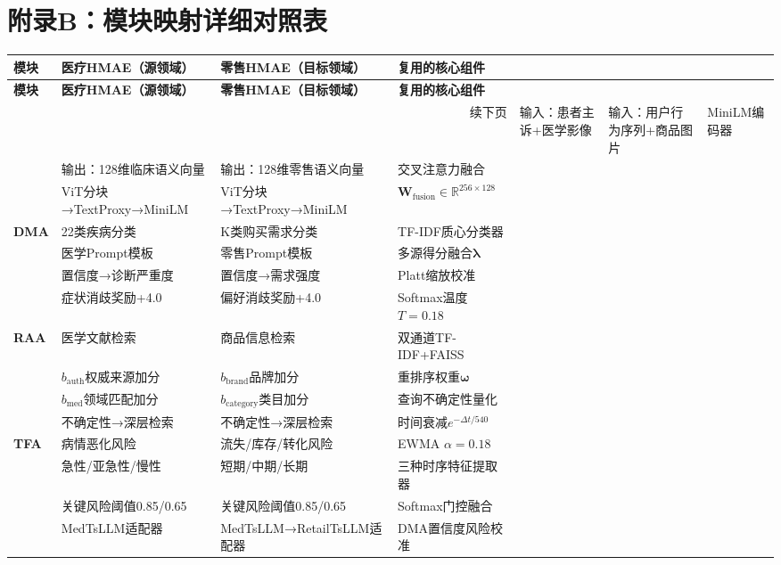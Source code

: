 \documentclass[11pt,a4paper]{ctexart}
\theoremstyle{remark}
\begin{document}
\newpage

\section*{附录B：模块映射详细对照表}

\begin{longtable}{p{2.2cm}|p{4.5cm}|p{4.5cm}|p{3cm}}
\toprule
\textbf{模块} & \textbf{医疗HMAE（源领域）} & \textbf{零售HMAE（目标领域）} & \textbf{复用的核心组件} \\
\midrule
\endfirsthead
\midrule
\textbf{模块} & \textbf{医疗HMAE（源领域）} & \textbf{零售HMAE（目标领域）} & \textbf{复用的核心组件} \\
\midrule
\endhead
\midrule
\multicolumn{4}{r}{\small 续下页}
\endfoot
\bottomrule
\endlastfoot

\textbf{Perception} &
输入：患者主诉+医学影像 &
输入：用户行为序列+商品图片 &
MiniLM编码器\\
& 输出：128维临床语义向量 &
输出：128维零售语义向量 &
交叉注意力融合\\
& ViT分块→TextProxy→MiniLM &
ViT分块→TextProxy→MiniLM &
$\mathbf{W}_{\text{fusion}} \in \mathbb{R}^{256 \times 128}$ \\
\midrule

\textbf{DMA} &
22类疾病分类 &
K类购买需求分类 &
TF-IDF质心分类器\\
& 医学Prompt模板 &
零售Prompt模板 &
多源得分融合$\boldsymbol{\lambda}$\\
& 置信度→诊断严重度 &
置信度→需求强度 &
Platt缩放校准\\
& 症状消歧奖励+4.0 &
偏好消歧奖励+4.0 &
Softmax温度$T=0.18$ \\
\midrule

\textbf{RAA} &
医学文献检索 &
商品信息检索 &
双通道TF-IDF+FAISS\\
& $b_{\text{auth}}$权威来源加分 &
$b_{\text{brand}}$品牌加分 &
重排序权重$\boldsymbol{\omega}$\\
& $b_{\text{med}}$领域匹配加分 &
$b_{\text{category}}$类目加分 &
查询不确定性量化\\
& 不确定性→深层检索 &
不确定性→深层检索 &
时间衰减$e^{-\Delta t/540}$ \\
\midrule

\textbf{TFA} &
病情恶化风险 &
流失/库存/转化风险 &
EWMA $\alpha=0.18$\\
& 急性/亚急性/慢性 &
短期/中期/长期 &
三种时序特征提取器\\
& 关键风险阈值0.85/0.65 &
关键风险阈值0.85/0.65 &
Softmax门控融合\\
& MedTsLLM适配器 &
MedTsLLM→RetailTsLLM适配器 &
DMA置信度风险校准 \\
\midrule


\end{longtable}
\end{document}
